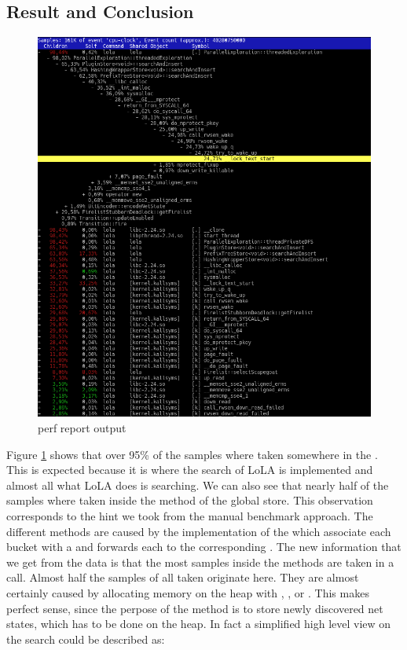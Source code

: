 \subsection{Result and Conclusion}
\label{first_perf_results}
\begin{figure}
    \centering
    \includegraphics[width=\textwidth]{pictures/perfReportSample.png}
    \caption{perf report output}
    \label{perf_record_sample}
\end{figure}
Figure \ref{perf_record_sample} shows that over 95\% of the samples where taken somewhere in the . This is expected because it is where the search of LoLA is implemented and almost all what LoLA does is searching. We can also see that nearly half of the samples where taken inside the  method of the global store. This observation corresponds to the hint we took from the manual benchmark approach. The different  methods are caused by the implementation of the  which associate each bucket with a  and forwards each  to the corresponding .
The new information that we get from the data is that the most samples inside the  methods are taken in a  call. Almost half the samples of all taken originate here. They are almost certainly caused by allocating memory on the heap with , , or . This makes perfect sense, since the perpose of the  method is to store newly discovered net states, which has to be done on the heap. In fact a simplified high level view on the search could be described as:
